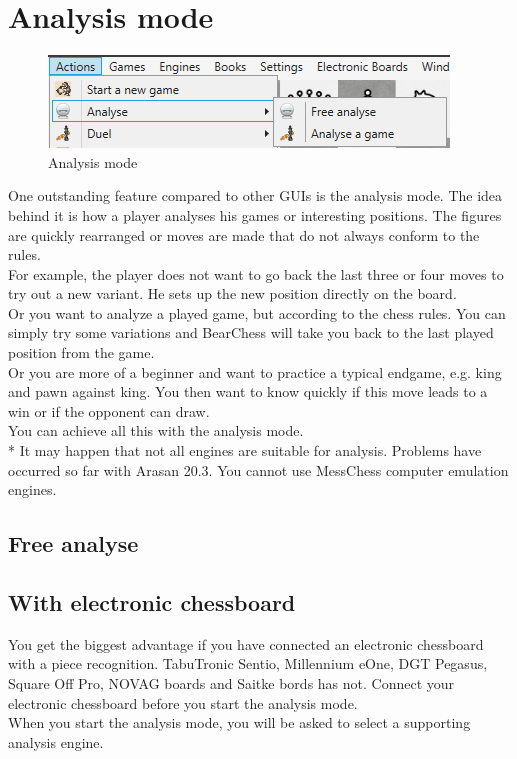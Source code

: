 \documentclass[11pt,a4paper]{article}
\begin{document}
\section{Analysis mode} \label{AnalyzeMode}


\begin{figure}[H]
	\centering
	\includegraphics[scale=1.0]{AnalyzeMode.png}
	\caption{Analysis mode}
	\label{fig:AnalyzeMode}
\end{figure}


One outstanding feature compared to other GUIs is the analysis mode. The idea behind it is how a player analyses his games or interesting positions. The figures are quickly rearranged or moves are made that do not always conform to the rules.\\
For example, the player does not want to go back the last three or four moves to try out a new variant. He sets up the new position directly on the board.\\
Or you want to analyze a played game, but according to the chess rules. You can simply try some variations and BearChess will take you back to the last played position from the game.\\
Or you are more of a beginner and want to practice a typical endgame, e.g. king and pawn against king. You then want to know quickly if this move leads to a win or if the opponent can draw.\\
You can achieve all this with the analysis mode.\\


{\color{red}*} It may happen that not all engines are suitable for analysis. Problems have occurred so far with Arasan 20.3. You cannot use MessChess computer emulation engines.

\subsection{Free analyse} \label{AnalyzeMode1}

\subsection{With electronic chessboard}

You get the biggest advantage if you have connected an electronic chessboard with a piece recognition. TabuTronic Sentio, Millennium eOne, DGT Pegasus, Square Off Pro, NOVAG boards and Saitke bords has not. Connect your electronic chessboard before you start the analysis mode.\\ 
When you start the analysis mode, you will be asked to select a supporting analysis engine.
\end{document}
